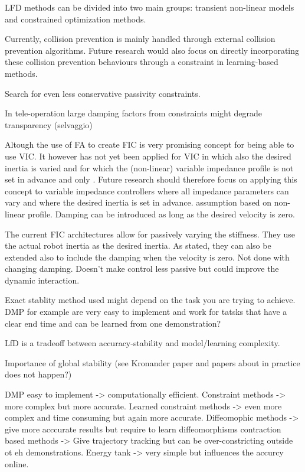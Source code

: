 LFD methods can be divided into two main groups: transient non-linear models and constrained optimization methods.


Currently, collision prevention is mainly handled through external collision prevention algorithms. Future research would also focus on directly incorporating these collision prevention behaviours through a constraint in learning-based methods.


Search for even less conservative passivity constraints.


In tele-operation large damping factors from constraints might degrade transparency (selvaggio)


Altough the use of FA to create FIC is very promising concept for being able to use VIC. It however has not yet been applied for VIC in which also the desired inertia is varied and for which the (non-linear) variable impedance profile is not set in advance and only . Future research should therefore focus on applying this concept to variable impedance controllers where all impedance parameters can vary and where the desired inertia is set in advance. assumption based on non-linear profile.
Damping can be introduced as long as the desired velocity is zero.

The current FIC architectures allow for passively varying the stiffness. They use the actual robot inertia as the desired inertia. As stated, they can also be extended also to include the damping when the velocity is zero.
Not done with changing damping. Doesn't make control less passive but could improve the dynamic interaction.


Exact stablity method used might depend on the task you are trying to achieve. DMP for example are very easy to implement and work for tatsks that have a clear end time and can be learned from one demonstration?

LfD is a tradeoff between accuracy-stability and model/learning complexity.

Importance of global stability (see Kronander paper and papers about in practice does not happen?)


DMP easy to implement -> computationally efficient.
Constraint methods -> more complex but more accurate.
Learned constraint methods -> even more complex and time consuming but again more accurate.
Diffeomophic methods -> give more acccurate results but require to learn diffeomorphisms
contraction based methods -> Give trajectory tracking but can be over-constricting outside ot eh demonstrations.
Energy tank -> very simple but influences the accurcy online.

